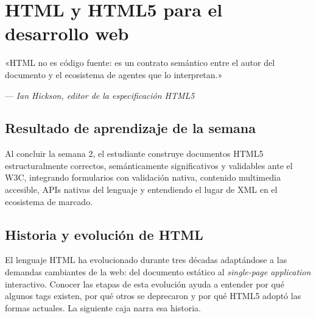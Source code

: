 \documentclass[11pt,a4paper,openany]{book}
\begin{document}
\chapter{HTML y HTML5 para el desarrollo web}
\label{cap:semana2}

\epigraph{«HTML no es código fuente: es un contrato semántico entre el
autor del documento y el ecosistema de agentes que lo interpretan.»}
{--- \textit{Ian Hickson, editor de la especificación HTML5}}

\section*{Resultado de aprendizaje de la semana}
Al concluir la semana 2, el estudiante construye documentos HTML5
estructuralmente correctos, semánticamente significativos y validables
ante el W3C, integrando formularios con validación nativa, contenido
multimedia accesible, APIs nativas del lenguaje y entendiendo el lugar
de XML en el ecosistema de marcado.

\section{Historia y evolución de HTML}

El lenguaje HTML ha evolucionado durante tres décadas
adaptándose a las demandas cambiantes de la web: del documento
estático al \emph{single-page application} interactivo. Conocer las
etapas de esta evolución ayuda a entender por qué algunos tags
existen, por qué otros se deprecaron y por qué HTML5 adoptó las
formas actuales. La siguiente caja narra esa historia.
\end{document}
